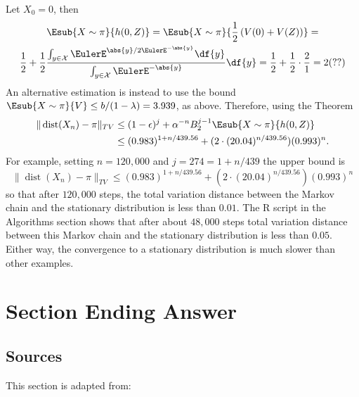 \documentclass[12pt]{article}
\begin{document}
\begin{example}
    Let \( X_0 = 0 \), then
    \begin{multline*}
        \Esub{X \sim \pi}{h(0,Z)} = \Esub{X \sim \pi}{\frac{1}{2} \left(
        V(0) + V(Z) \right) }= \\
        \frac{1}{2} + \frac{1}{2} \frac{\int_{y \in \mathcal{X}} \EulerE^
        {\abs{y}/2 \EulerE^{-\abs{y}}} \df{y}}{\int_{y \in \mathcal{X}}
        \EulerE^{-\abs{y}}} \df{y} = \frac{1}{2} + \frac{1}{2} \cdot
        \frac{2}{1} = 2 (??)
    \end{multline*}
    An alternative estimation is instead to use the bound \( \Esub{X
    \sim \pi}{V} \le b/(1-\lambda) = 3.939 \), as above.  Therefore,
    using the Theorem
    \begin{align*}
        \|
        \operatorname{dist}
        (X_n) - \pi \|_{TV} &\le (1- \epsilon)^j + \alpha^{-n} B_2^{j-1}
        \Esub{X \sim \pi}{h(0,Z)} \\
        &\le (0.983)^{1 + n/439.56} + (2 \cdot (20.04)^{n/439.56})(0.993)^n.
    \end{align*}
    For example, setting \( n = 120{,}000 \) and \( j = 274 = 1+ n/439 \)
    the upper bound is
    \[
        \|
        \operatorname{dist}
        (X_n) - \pi \|_{TV} \le (0.983)^{1 + n/439.56} + (2 \cdot (20.04)^
        {n/439.56})(0.993)^n
    \] so that after \( 120{,}000 \) steps, the total variation distance
    between the Markov chain and the stationary distribution is less
    than \( 0.01 \).  The R script in the Algorithms section shows that
    after about \( 48{,}000 \) steps total variation distance between
    this Markov chain and the stationary distribution is less than \(
    0.05 \).  Either way, the convergence to a stationary distribution
    is much slower than other examples.

\end{example}
\section*{Section Ending Answer}

\subsection*{Sources} This section is adapted from:

\nocite{}
\nocite{}

\hr

\end{document}
